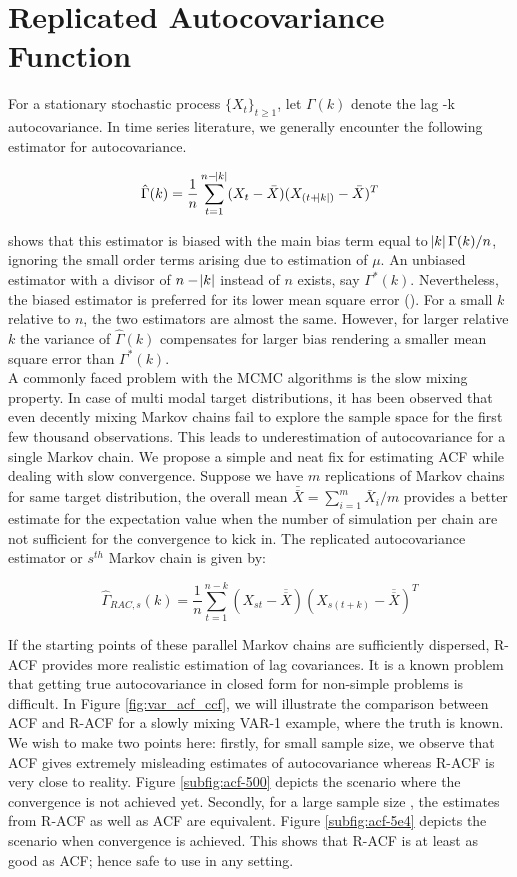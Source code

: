 \documentclass[12pt]{article}
\begin{document}
\section{Replicated Autocovariance Function} \label{sec:R-ACF}

For a stationary stochastic process $\{X_t\}_{t \geq 1}$, let $\Gamma(k)$ denote the lag -k autocovariance. In time series literature, we generally encounter the following estimator for autocovariance. 

\[
\hat{\Gamma}(k) = \dfrac{1}{n}\sum_{t=1}^{n-\abs{k}}(X_t - \bar{X})(X_{(t+\abs{k})} - \bar{X})^T
\]

\cite{priestley1981spectral} shows that this estimator is biased with the main bias term equal to $\abs{k}\Gamma(k)/n$, ignoring the small order terms arising due to estimation of $\mu$. An unbiased estimator with a divisor of $n - \abs{k}$ instead of $n$ exists, say $\Gamma^*(k)$. Nevertheless, the biased estimator is preferred for its lower mean square error (\cite{priestley1981spectral}). For a small $k$ relative to $n$, the two estimators are almost the same. However, for larger relative $k$ the variance of $\hat{\Gamma}(k)$ compensates for larger bias rendering a smaller mean square error than $\Gamma^*(k)$. \\

A commonly faced problem with the MCMC algorithms is the slow mixing property. In case of multi modal target distributions, it has been observed that even decently mixing Markov chains fail to explore the sample space for the first few thousand observations. This leads to underestimation of autocovariance for a single Markov chain. We propose a simple and neat fix for estimating ACF while dealing with slow convergence. Suppose we have $m$ replications of Markov chains for same target distribution, the overall mean $\bar{\bar{X}} = \sum_{i = 1}^{m}\bar{X}_i/m$ provides a better estimate for the expectation value when the number of simulation per chain are not sufficient for the convergence to kick in. The replicated autocovariance estimator or $s^{th}$ Markov chain is given by:

\[
\hat{\Gamma}_{RAC,s}(k) = \dfrac{1}{n}\sum_{t=1}^{n-k}(X_{st}-\overline{\overline{X}})(X_{s(t+k)}-\overline{\overline{X}})^T
\]

If the starting points of these parallel Markov chains are sufficiently dispersed, R-ACF provides more realistic estimation of lag covariances. It is a known problem that getting true autocovariance in closed form for non-simple problems is difficult. In Figure \ref{fig:var_acf_ccf}, we will illustrate the comparison between ACF and R-ACF for a slowly mixing VAR-1 example, where the truth is known. We wish to make two points here: firstly, for small sample size, we observe that ACF gives extremely misleading estimates of autocovariance whereas R-ACF is very close to reality. Figure \ref{subfig:acf-500} depicts the scenario where the convergence is not achieved yet. Secondly, for a large sample size , the estimates from R-ACF as well as ACF are equivalent. Figure \ref{subfig:acf-5e4} depicts the scenario when convergence is achieved. This shows that R-ACF is at least as good as ACF; hence safe to use in any setting.
\end{document}
